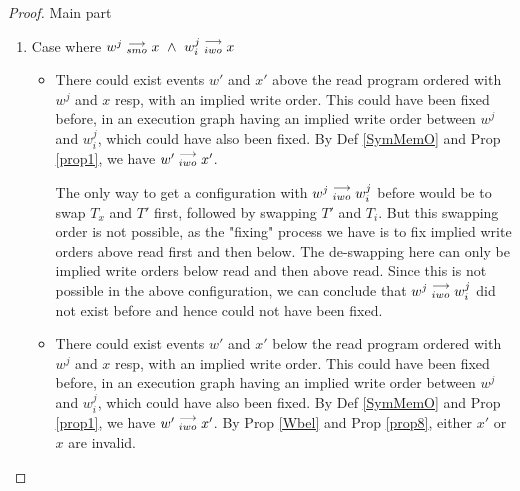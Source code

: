 \begin{proof}{Main part}
\begin{itemize}
\begin{enumerate}
                            \item Case where $w^j\stackrel{\longrightarrow}{_{smo}}x \ \wedge \ w_i^j\stackrel{\longrightarrow}{_{iwo}}x$
                        
                                \begin{itemize}
                                
                                    \item There could exist events $w'$ and $x'$ above the read program ordered with $w^j$ and $x$ resp, with an implied write order. This could have been fixed before, in an execution graph having an implied write order between $w^j$ and $w_i^j$, which could have also been fixed.
                                    By Def \ref{SymMemO} and Prop \ref{prop1}, we have $w'\stackrel{\longrightarrow}{_{iwo}}x'$.

                                    The only way to get a configuration with $w^j\stackrel{\longrightarrow}{_{iwo}}w_i^j$ before would be to swap $T_x$ and $T'$ first, followed by swapping $T'$ and $T_i$. 
                                    But this swapping order is not possible, as the "fixing" process we have is to fix implied write orders above read first and then below. 
                                    The de-swapping here can only be implied write orders below read and then above read. 
                                    Since this is not possible in the above configuration, we can conclude that $w^j\stackrel{\longrightarrow}{_{iwo}}w_i^j$ did not exist before and hence could not have been fixed.
                                

                                    \item There could exist events $w'$ and $x'$ below the read program ordered with $w^j$ and $x$ resp, with an implied write order. This could have been fixed before, in an execution graph having an implied write order between $w^j$ and $w_i^j$, which could have also been fixed.
                                    By Def \ref{SymMemO} and Prop \ref{prop1}, we have $w'\stackrel{\longrightarrow}{_{iwo}}x'$.
                                    By Prop \ref{Wbel} and Prop \ref{prop8}, either $x'$ or $x$ are invalid. 


\end{itemize}
\end{enumerate}
\end{itemize}
\end{proof}
